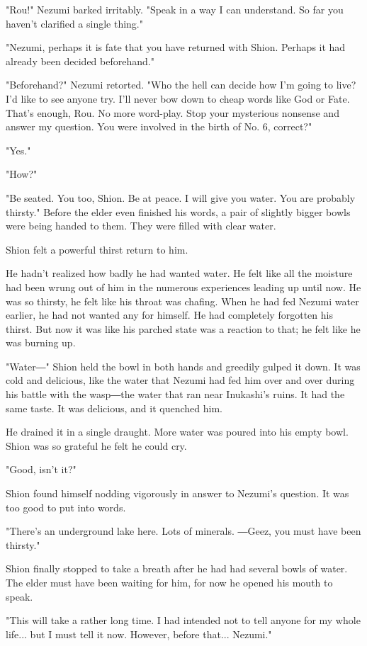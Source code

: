 "Rou!" Nezumi barked irritably. "Speak in a way I can understand. So far
you haven't clarified a single thing."

"Nezumi, perhaps it is fate that you have returned with Shion. Perhaps
it had already been decided beforehand."

"Beforehand?" Nezumi retorted. "Who the hell can decide how I'm going to
live? I'd like to see anyone try. I'll never bow down to cheap words
like God or Fate. That's enough, Rou. No more word-play. Stop your
mysterious nonsense and answer my question. You were involved in the
birth of No. 6, correct?"

"Yes."

"How?"

"Be seated. You too, Shion. Be at peace. I will give you water. You are
probably thirsty." Before the elder even finished his words, a pair of
slightly bigger bowls were being handed to them. They were filled with
clear water.

Shion felt a powerful thirst return to him.

He hadn't realized how badly he had wanted water. He felt like all the
moisture had been wrung out of him in the numerous experiences leading
up until now. He was so thirsty, he felt like his throat was chafing.
When he had fed Nezumi water earlier, he had not wanted any for himself.
He had completely forgotten his thirst. But now it was like his parched
state was a reaction to that; he felt like he was burning up.

"Water―" Shion held the bowl in both hands and greedily gulped it down.
It was cold and delicious, like the water that Nezumi had fed him over
and over during his battle with the wasp―the water that ran near
Inukashi's ruins. It had the same taste. It was delicious, and it
quenched him.

He drained it in a single draught. More water was poured into his empty
bowl. Shion was so grateful he felt he could cry.

"Good, isn't it?"

Shion found himself nodding vigorously in answer to Nezumi's question.
It was too good to put into words.

"There's an underground lake here. Lots of minerals. ―Geez, you must
have been thirsty."

Shion finally stopped to take a breath after he had had several bowls of
water. The elder must have been waiting for him, for now he opened his
mouth to speak.

"This will take a rather long time. I had intended not to tell anyone
for my whole life... but I must tell it now. However, before that...
Nezumi."


